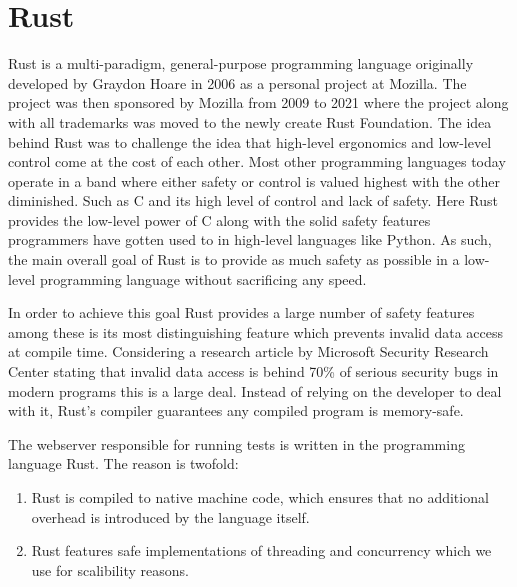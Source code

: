 \section*{Rust}
Rust is a multi-paradigm, general-purpose programming language originally developed by Graydon Hoare in 2006 as a personal project at Mozilla. 
The project was then sponsored by Mozilla from 2009 to 2021 where the project along with all trademarks was moved to the newly create Rust Foundation. 
The idea behind Rust was to challenge the idea that high-level ergonomics and low-level control come at the cost of each other\cite{Rust_Book}.
Most other programming languages today operate in a band where either safety or control is valued highest with the other diminished. Such as C and its high level of control and lack of safety. 
Here Rust provides the low-level power of C along with the solid safety features programmers have gotten used to in high-level languages like Python. 
As such, the main overall goal of Rust is to provide as much safety as possible in a low-level programming language without sacrificing any speed\cite{Rust_in_Action}.

In order to achieve this goal Rust provides a large number of safety features among these is its most distinguishing feature which prevents invalid data access at compile time. 
Considering a research article by Microsoft Security Research Center stating that invalid data access is behind 70\% of serious security bugs in modern programs this is a large deal\cite{Safe_Systems_Languages}. 
Instead of relying on the developer to deal with it, Rust's compiler guarantees any compiled program is memory-safe.

The webserver responsible for running tests is written in the programming language Rust. 
The reason is twofold: 
\begin{enumerate}
    \item Rust is compiled to native machine code, which ensures that no additional overhead is introduced by the language itself. 
    \item Rust features safe implementations of threading and concurrency which we use for scalibility reasons.
\end{enumerate}    

